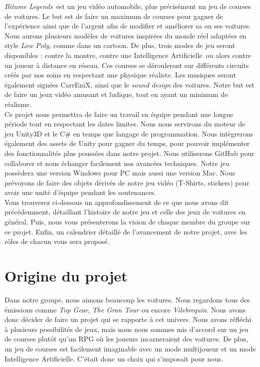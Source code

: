 \documentclass[12pt,a4paper]{article}
\newcommand{\btmlgs}{\textit{Bitume Legends}}
\newcommand{\AI}{Intelligence Artificielle}
\newcommand{\CEX}{CarrEniX}
\begin{document}
  \btmlgs\, est un jeu vidéo automobile, plus précisément un jeu de courses de voitures. Le but est 
  de faire un maximum de courses pour gagner de l'expérience ainsi que de l'argent afin de
  modifier et améliorer sa ou ses voitures.
  Nous aurons plusieurs modèles de voitures inspirées du monde réel adaptées en style \textit{Low Poly},
  comme dans un cartoon. De plus, trois modes de jeu seront disponibles : contre la montre, contre une \AI\,
  ou alors contre un joueur à distance en réseau. Ces courses se dérouleront sur différents circuits créés 
  par nos soins en respectant une physique réaliste.
  Les musiques seront également signées \CEX, ainsi que le \textit{sound design} des voitures.
  Notre but est de faire un jeux vidéo amusant et ludique, tout en ayant un minimum de réalisme.\\
  
  Ce projet nous permettra de faire un travail en équipe pendant une longue période tout en respectant les dates limites.
  Nous nous servirons du moteur de jeu Unity3D et le C\# en temps que langage de programmation. Nous intègrerons 
  également des assets de Unity pour gagner du temps, pour pouvoir implémenter des fonctionnalités plus poussées dans notre projet.
  Nous utiliserons GitHub pour collaborer et nous échanger facilement nos avancées techniques.
  Notre jeu possèdera une version Windows pour PC mais aussi une version Mac.
  Nous prévoyons de faire des objets dérivés de notre jeu vidéo (T-Shirts, stickers) pour avoir une unité d'équipe 
  pendant les soutenances.\\
  
  Vous trouverez ci-dessous un approfondissement de ce que nous avons dit précédemment, détaillant l'histoire de notre jeu 
  et celle des jeux de voitures
  en général. Puis, nous vous présenterons la vision de chaque membre du groupe sur ce projet. Enfin, un calendrier 
  détaillé de l'avancement de notre projet, avec les rôles de chacun vous sera proposé.
  
\clearpage

\section{Origine du projet}
  Dans notre groupe, nous aimons beaucoup les voitures. Nous regardons tous des émissions comme 
  \textit{Top Gear}, \textit{The Gran Tour} ou encore \textit{Vilebrequin}. Nous avons donc décider de faire
  un projet qui se rapporte à cet univers. Nous avons réfléchi à plusieurs possibilités de jeux, mais nous
  nous sommes mis d'accord sur un jeu de courses plutôt qu'un RPG où les joueurs incarneraient des voitures.
  De plus, un jeu de courses est facilement imaginable avec un mode multijoueur et un mode Intelligence 
  Artificielle. C'était donc un choix qui s'imposait pour nous.\\
  
\end{document}
